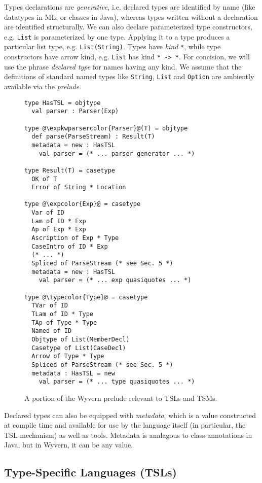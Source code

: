 \documentclass{sig-alternate}[10pt]
\newcommand{\expkwparsercolor}[1]{\textcolor[HTML]{336699}{#1}}
\newcommand{\expcolor}[1]{\textcolor[HTML]{FF0033}{#1}}
\newcommand{\typecolor}[1]{\textcolor[HTML]{660066}{#1}}
\newcommand{\mycaption}[1]{\vspace{-4px}\caption{#1}\vspace{-2px}}
\begin{document}
Types declarations are \emph{generative}, i.e. declared types are identified by name (like datatypes in ML, or classes in Java), whereas types written without a declaration are identified structurally. We can also declare parameterized type constructors, e.g. \verb|List| is parameterized by one type. Applying it to a type produces a particular list type, e.g. \verb|List(String)|. Types have \emph{kind} \verb|*|, while {type constructors} have arrow kind, e.g. \verb|List| has kind \verb|* -> *|. For concision, we will use the phrase \emph{declared type} for names having any kind. 
We assume that the definitions of standard named types like \verb|String|, \verb|List| and \verb|Option| are ambiently available via the \emph{prelude}. 

\begin{figure}[t!]
\begin{lstlisting}[style=wyvern]
type HasTSL = objtype
  val parser : Parser(Exp)

type @\expkwparsercolor{Parser}@(T) = objtype
  def parse(ParseStream) : Result(T)
  metadata = new : HasTSL
    val parser = (* ... parser generator ... *)

type Result(T) = casetype
  OK of T
  Error of String * Location

type @\expcolor{Exp}@ = casetype
  Var of ID
  Lam of ID * Exp
  Ap of Exp * Exp
  Ascription of Exp * Type
  CaseIntro of ID * Exp
  (* ... *)
  Spliced of ParseStream (* see Sec. 5 *)
  metadata = new : HasTSL
    val parser = (* ... exp quasiquotes ... *)

type @\typecolor{Type}@ = casetype
  TVar of ID
  TLam of ID * Type
  TAp of Type * Type
  Named of ID
  Objtype of List(MemberDecl)
  Casetype of List(CaseDecl)
  Arrow of Type * Type
  Spliced of ParseStream (* see Sec. 5 *)
  metadata : HasTSL = new
    val parser = (* ... type quasiquotes ... *)
\end{lstlisting}
\mycaption{A portion of the Wyvern prelude relevant to TSLs and TSMs.}
\label{exp-prelude}
\end{figure}


Declared types can also be equipped with \emph{metadata}, which is a value constructed at compile time and available for use by the language itself (in particular, the TSL mechanism) as well as tools. Metadata is analagous to class annotations in Java, but in Wyvern, it can be any value. %

\subsection{Type-Specific Languages (TSLs)}
\end{document}
